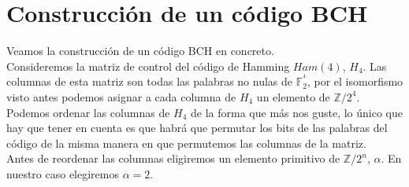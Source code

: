 %
%

\section{Construcci\'on de un c\'odigo BCH}

Veamos la construcci\'on de un c\'odigo BCH en concreto.\\

Consideremos la matriz de control del c\'odigo de Hamming $Ham(4)$, $H_4$. Las
columnas de esta matriz son todas las palabras no nulas de $\mathbb{F}^{^4}_2$,
por el isomorfismo visto antes podemos asignar a cada columna de $H_4$ un
elemento de $\mathbb{Z}/2^4$.\\

Podemos ordenar las columnas de $H_4$ de la forma que m\'as nos guste, lo 
\'unico que hay que tener en cuenta es que habr\'a que permutar los bits de
las palabras del c\'odigo de la misma manera en que permutemos las columnas de
la matriz.\\

Antes de reordenar las columnas eligiremos un elemento primitivo de
$\mathbb{Z}/2^n$, $\alpha$. En nuestro caso elegiremos $\alpha=2$.\\

